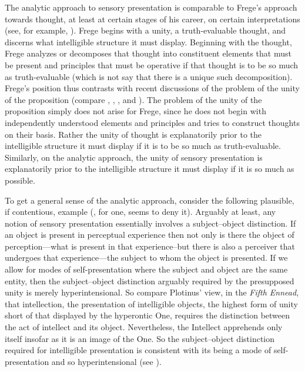 The analytic approach to sensory presentation is comparable to Frege's approach towards thought, at least at certain stages of his career, on certain interpretations (see, for example, \citealt[essays 7 and 9]{Travis:2011qd}). Frege begins with a unity, a truth-evaluable thought, and discerns what intelligible structure it must display. Beginning with the thought, Frege analyzes or decomposes that thought into constituent elements that must be present and principles that must be operative if that thought is to be so much as truth-evaluable (which is not say that there is a unique such decomposition). Frege's position thus contrasts with recent discussions of the problem of the unity of the proposition (compare \citealt{King:2007ad}, \citealt{Gaskin:2008aa}, \citealt{Soames:2010qq}, and \citealt{King:2014ls}). The problem of the unity of the proposition simply does not arise for Frege, since he does not begin with independently understood elements and principles and tries to construct thoughts on their basis. Rather the unity of thought is explanatorily prior to the intelligible structure it must display if it is to be so much as truth-evaluable. Similarly, on the analytic approach, the unity of sensory presentation is explanatorily prior to the intelligible structure it must display if it is so much as possible.

To get a general sense of the analytic approach, consider the following plausible, if contentious, example (\citealt{Johnston:2007qy}, for one, seems to deny it). Arguably at least, any notion of sensory presentation essentially involves a subject--object distinction. If an object is present in perceptual experience then not only is there the object of perception---what is present in that experience--but there is also a perceiver that undergoes that experience---the subject to whom the object is presented. If we allow for modes of self-presentation where the subject and object are the same entity, then the subject--object distinction arguably required by the presupposed unity is merely hyperintensional. So compare Plotinus' view, in the \emph{Fifth Ennead}, that intellection, the presentation of intelligible objects, the highest form of unity short of that displayed by the hyperontic One, requires the distinction between the act of intellect and its object. Nevertheless, the Intellect apprehends only itself insofar as it is an image of the One. So the subject--object distinction required for intelligible presentation is consistent with its being a mode of self-presentation and so hyperintensional (see \citealt[chapter 3.1]{Gerson:1994aa}). 

